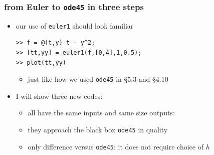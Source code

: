 \documentclass[urlcolor=blue,dvipsnames]{beamer}
\begin{document}
\begin{frame}[fragile]
\frametitle{from Euler to \texttt{ode45} in three steps}

\begin{itemize}
\item our use of \texttt{euler1} should look familiar

\begin{Verbatim}[fontsize=\small]
>> f = @(t,y) t - y^2;
>> [tt,yy] = euler1(f,[0,4],1,0.5);
>> plot(tt,yy)
\end{Verbatim}
     \begin{itemize}
     \item just like how we used \texttt{ode45} in \S5.3 and \S4.10
     \end{itemize}
\item I will show three {\color{Green} new codes}:
\color{Green}{
\begin{Verbatim}
function [t,y] = euler1(f,tspan,y0,h)
function [t,y] = improved2(f,tspan,y0,h)
function [t,y] = rk4(f,tspan,y0,h)     % section 9.2
\end{Verbatim}
}

\vspace{-2mm}
\color{Black}{
\begin{Verbatim}
function [t,y] = ode45(f,tspan,y0)
\end{Verbatim}
}
    \begin{itemize}
     \item all have the same inputs and same size outputs:
     \item they approach the black box \texttt{ode45} in quality
     \item only difference versus \texttt{ode45}: it does not require choice of $h$
     \end{itemize}
\end{itemize}
\end{frame}
\end{document}
